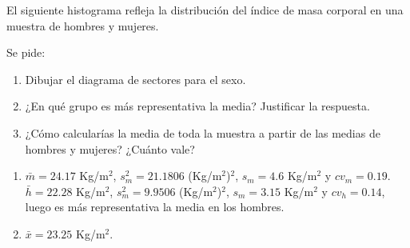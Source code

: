 {El siguiente histograma refleja la distribución del índice de masa corporal en una muestra de hombres y mujeres.
\begin{center}
\resizebox{0.6\textwidth}{!}{}
\end{center}
Se pide:
\begin{enumerate}
\item Dibujar el diagrama de sectores para el sexo.
\item ¿En qué grupo es más representativa la media? Justificar la respuesta.
\item ¿Cómo calcularías la media de toda la muestra a partir de las medias de hombres y mujeres? ¿Cuánto vale?
\end{enumerate}
}
{\begin{enumerate}[start=2]
\item $\bar{m} =24.17$ Kg/m$^2$, $s_{m}^2=21.1806$ (Kg/m$^2$)$^2$, $s_m=4.6$ Kg/m$^2$ y $cv_m = 0.19$.\\
$\bar{h} =22.28$ Kg/m$^2$, $s_{m}^2=9.9506$ (Kg/m$^2$)$^2$, $s_m=3.15$ Kg/m$^2$ y $cv_h = 0.14$, luego es más representativa la media en los hombres.
\item $\bar{x}=23.25$ Kg/m$^2$.
\end{enumerate}
}
